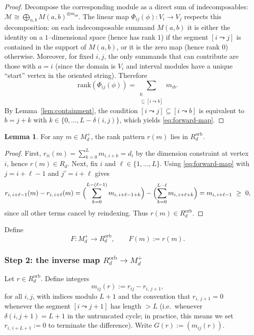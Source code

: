 \documentclass{article}
\theoremstyle{definition}
\newtheorem{lemma}[theorem]{Lemma}
\begin{document}
\begin{proof}
Decompose the corresponding module as a direct sum of indecomposables:
$\mathcal M \cong \bigoplus_{a,b} M(a,b)^{\oplus m_{ab}}$.
The linear map $\Phi_{ij}(\phi):V_i\to V_j$ respects this decomposition:
on each indecomposable summand $M(a,b)$ it is either the identity on a
$1$--dimensional space (hence has rank $1$) if the segment $[i\leadsto j]$
is contained in the support of $M(a,b)$, or it is the zero map (hence rank $0$)
otherwise.
Moreover, for fixed $i,j$, the only summands that can contribute are those
with $a=i$ (since the domain is $V_i$ and interval modules have a unique
``start'' vertex in the oriented string).
Therefore
\[
\mathrm{rank}(\Phi_{ij}(\phi))
=
\sum_{\substack{b:\\ [i\leadsto j]\subseteq [i\leadsto b]}}
m_{i b}.
\]
By Lemma~\ref{lem:containment}, the condition
$[i\leadsto j]\subseteq [i\leadsto b]$ is equivalent to $b=j+k$ with
$k\in\{0,\dots,L-\delta(i,j)\}$, which yields \eqref{eq:forward-map}.
\end{proof}

\begin{lemma}\label{lem:orb-ineq}
For any $m\in M_d^+$, the rank pattern $r(m)$ lies in $R_d^{\mathrm{orb}}$.
\end{lemma}

\begin{proof}
First, $r_{ii}(m)=\sum_{k=0}^{L} m_{i,i+k}=d_i$ by the dimension constraint at
vertex $i$, hence $r(m)\in R_d$.
Next, fix $i$ and $\ell\in\{1,\dots,L\}$. Using \eqref{eq:forward-map} with
$j=i+\ell-1$ and $j'=i+\ell$ gives
\[
r_{i,\,i+\ell-1}(m)-r_{i,\,i+\ell}(m)
=
\Bigl(\sum_{k=0}^{L-(\ell-1)} m_{i,\,i+\ell-1+k}\Bigr)
-
\Bigl(\sum_{k=0}^{L-\ell} m_{i,\,i+\ell+k}\Bigr)
=
m_{i,\,i+\ell-1}\ \ge\ 0,
\]
since all other terms cancel by reindexing.
Thus $r(m)\in R_d^{\mathrm{orb}}$.
\end{proof}

Define
\[
F: M_d^+ \longrightarrow R_d^{\mathrm{orb}},\qquad F(m):=r(m).
\]

\subsubsection*{Step 2: the inverse map $R_d^{\mathrm{orb}}\to M_d^+$}
Let $r\in R_d^{\mathrm{orb}}$. Define integers
\begin{equation}\label{eq:inverse-map}
m_{ij}(r)
:=
r_{ij}-r_{i,\,j+1},
\end{equation}
for all $i,j$, with indices modulo $L+1$ and the convention that
$r_{i,\,j+1}=0$ whenever the segment $[i\leadsto j+1]$ has length $>L$
(i.e.\ whenever $\delta(i,j+1)=L+1$ in the untruncated cycle; in practice, this
means we set $r_{i,\,i+L+1}:=0$ to terminate the difference).
Write $G(r):=(m_{ij}(r))$.
\end{document}
